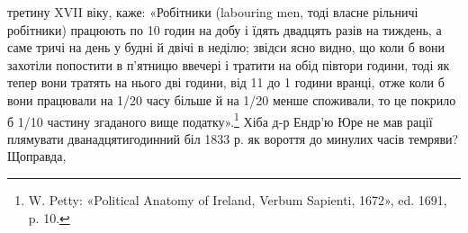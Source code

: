 третину XVII віку, каже: «Робітники (labouring men, тоді власне
рільничі робітники) працюють по 10 годин на добу і їдять двадцять
разів на тиждень, а саме тричі на день у будні й двічі в неділю;
звідси ясно видно, що коли б вони захотіли попостити в
п’ятницю ввечері і тратити на обід півтори години, тоді як тепер
вони тратять на нього дві години, від 11 до 1 години вранці, отже
коли б вони працювали на 1/20 часу більше й на 1/20 менше споживали,
то це покрило б 1/10 частину згаданого вище податку».\footnote{
W. Petty: «Political Anatomy of Ireland, Verbum Sapienti, 1672»,
ed. 1691, p. 10.
}
Хіба д-р Ендр’ю Юре не мав рації плямувати дванадцятигодинний
біл 1833 р. як вороття до минулих часів темряви? Щоправда,
\parbreak{}  %
